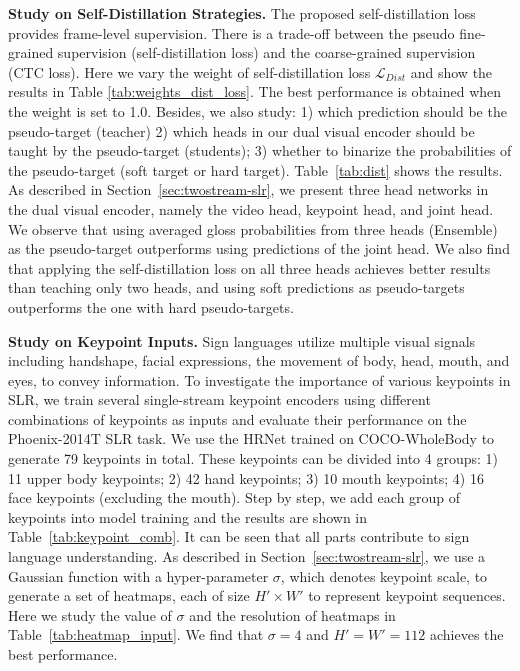 \documentclass{article}
\begin{document}
\textbf{Study on Self-Distillation Strategies.} The proposed self-distillation loss provides frame-level supervision. There is a trade-off between the pseudo fine-grained supervision (self-distillation loss) and the coarse-grained supervision (CTC loss). Here we vary the weight of self-distillation loss $\mathcal{L}_{Dist}$ and show the results in Table \ref{tab:weights_dist_loss}. The best performance is obtained when the weight is set to 1.0.
Besides, we also study: 1) which prediction should be the pseudo-target (teacher) 2) which heads in our dual visual encoder should be taught by the pseudo-target (students); 3) whether to binarize the probabilities of the pseudo-target (soft target or hard target). Table~\ref{tab:dist} shows the results. As described in Section~\ref{sec:twostream-slr}, we present three head networks in the dual visual encoder, namely the video head, keypoint head, and joint head. We observe that using averaged gloss probabilities from three heads (Ensemble) as the pseudo-target outperforms using predictions of the joint head. We also find that applying the self-distillation loss on all three heads achieves better results than teaching only two heads, and using soft predictions as pseudo-targets outperforms the one with hard pseudo-targets.


\textbf{Study on Keypoint Inputs.}
Sign languages utilize multiple visual signals including handshape, facial expressions, the movement of body, head, mouth, and eyes, to convey information. To investigate the importance of various keypoints in SLR, we train several single-stream keypoint encoders using different combinations of keypoints as inputs and evaluate their performance on the Phoenix-2014T SLR task. We use the HRNet trained on COCO-WholeBody to generate 79 keypoints in total. These keypoints can be divided into 4 groups: 1) 11 upper body keypoints; 2) 42 hand keypoints; 3) 10 mouth keypoints; 4) 16 face keypoints (excluding the mouth). Step by step, we add each group of keypoints into model training and the results are shown in Table~\ref{tab:keypoint_comb}. It can be seen that all parts contribute to sign language understanding. As described in Section~\ref{sec:twostream-slr}, we use a Gaussian function with a hyper-parameter $\sigma$, which denotes keypoint scale, to generate a set of heatmaps, each of size $H' \times W'$ to represent keypoint sequences. Here we study the value of $\sigma$ and the resolution of heatmaps in Table~\ref{tab:heatmap_input}. We find that $\sigma=4$ and $H'=W'=112$ achieves the best performance.
\end{document}
